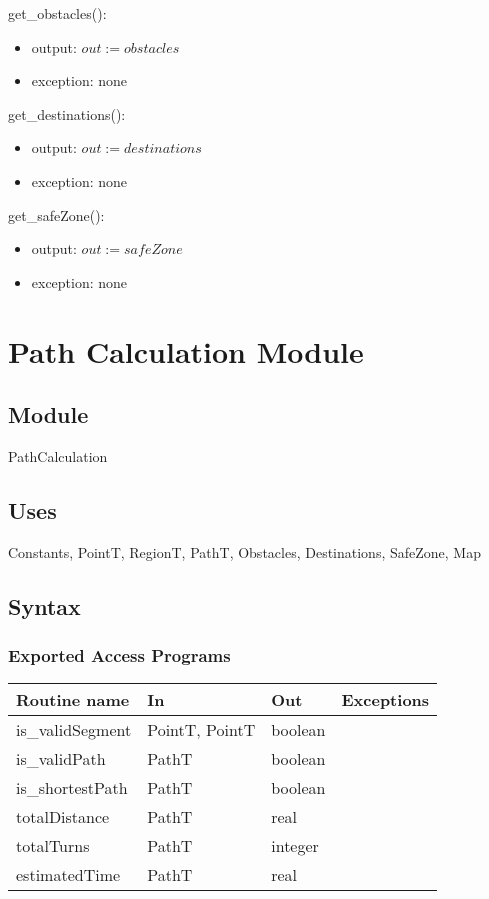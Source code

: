 \documentclass[12pt]{article}
\begin{document}
\noindent get\_obstacles():
\begin{itemize}
\item output: $\mathit{out} := \mathit{obstacles}$
\item exception: none
\end{itemize}

\noindent get\_destinations():
\begin{itemize}
\item output: $\mathit{out} := \mathit{destinations}$
\item exception: none
\end{itemize}

\noindent get\_safeZone():
\begin{itemize}
\item output: $\mathit{out} := \mathit{safeZone}$
\item exception: none
\end{itemize}

\newpage

\section* {Path Calculation Module}

\subsection* {Module}

PathCalculation

\subsection* {Uses}

Constants, PointT, RegionT, PathT, Obstacles, Destinations, SafeZone, Map

\subsection* {Syntax}

\subsubsection* {Exported Access Programs}

\begin{tabular}{| l | l | l | l |}
\hline
\textbf{Routine name} & \textbf{In} & \textbf{Out} & \textbf{Exceptions}\\
\hline
is\_validSegment & PointT, PointT & boolean & ~\\
\hline
is\_validPath & PathT & boolean & ~\\
\hline
is\_shortestPath & PathT & boolean & ~\\
\hline
totalDistance & PathT & real & ~\\
\hline
totalTurns & PathT & integer & ~\\
\hline
estimatedTime & PathT & real & ~\\
\hline

\end{tabular}
\end{document}
